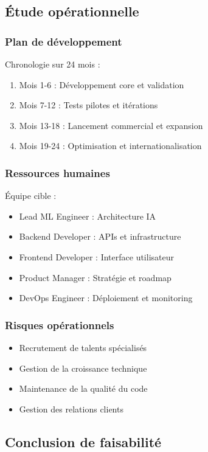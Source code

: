 \documentclass[12pt,a4paper]{report}
\begin{document}
\subsection{Étude opérationnelle}

\subsubsection{Plan de développement}

Chronologie sur 24 mois :
\begin{enumerate}
\item Mois 1-6 : Développement core et validation
\item Mois 7-12 : Tests pilotes et itérations
\item Mois 13-18 : Lancement commercial et expansion
\item Mois 19-24 : Optimisation et internationalisation
\end{enumerate}

\subsubsection{Ressources humaines}

Équipe cible :
\begin{itemize}
\item Lead ML Engineer : Architecture IA
\item Backend Developer : APIs et infrastructure
\item Frontend Developer : Interface utilisateur
\item Product Manager : Stratégie et roadmap
\item DevOps Engineer : Déploiement et monitoring
\end{itemize}

\subsubsection{Risques opérationnels}

\begin{itemize}
\item Recrutement de talents spécialisés
\item Gestion de la croissance technique
\item Maintenance de la qualité du code
\item Gestion des relations clients
\end{itemize}

\subsection{Conclusion de faisabilité}
\end{document}
